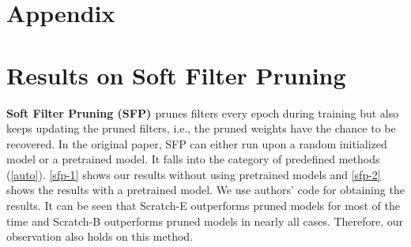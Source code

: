 
\section*{\LARGE{Appendix}}
\vspace{-1ex}
\section{Results on Soft Filter Pruning \citep{he2018sfp}}
\label{sec:sfp}


\textbf{Soft Filter Pruning (SFP) \citep{he2018sfp}} prunes filters every epoch during training but also keeps updating the pruned filters, i.e., the pruned weights have the chance to be recovered. In the original paper, SFP can either run upon a random initialized model or a pretrained model. It falls into the category of predefined methods (\autoref{auto}). \autoref{sfp-1} shows our results without using pretrained models and \autoref{sfp-2} shows the results with a pretrained model. We use authors' code \citep{sfpcode} for obtaining the results. It can be seen that Scratch-E outperforms pruned models for most of the time and Scratch-B outperforms pruned models in nearly all cases. Therefore, our observation also holds on this method.

